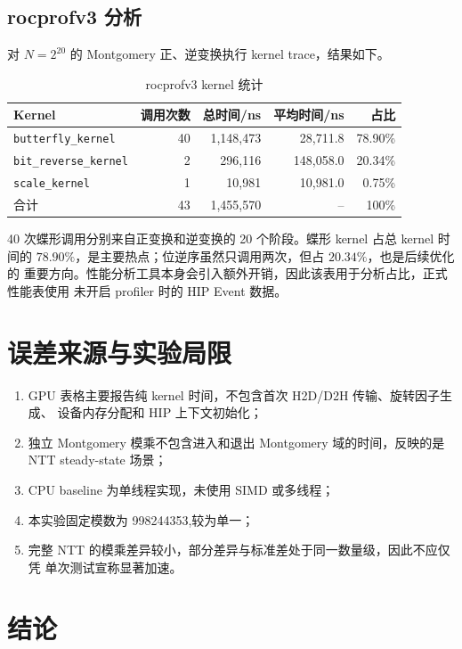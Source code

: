 ﻿\documentclass[a4paper]{article}
\begin{document}
\subsection{rocprofv3 分析}

对 $N=2^{20}$ 的 Montgomery 正、逆变换执行 kernel trace，结果如下。

\begin{table}[H]
  \centering
  \caption{rocprofv3 kernel 统计}
  \begin{tabular}{lrrrr}
    \toprule
    Kernel & 调用次数 & 总时间/ns & 平均时间/ns & 占比 \\
    \midrule
    \texttt{butterfly\_kernel} & 40 & 1,148,473 & 28,711.8 & 78.90\% \\
    \texttt{bit\_reverse\_kernel} & 2 & 296,116 & 148,058.0 & 20.34\% \\
    \texttt{scale\_kernel} & 1 & 10,981 & 10,981.0 & 0.75\% \\
    \midrule
    合计 & 43 & 1,455,570 & -- & 100\% \\
    \bottomrule
  \end{tabular}
\end{table}

40 次蝶形调用分别来自正变换和逆变换的 20 个阶段。蝶形 kernel 占总 kernel 时间的
$78.90\%$，是主要热点；位逆序虽然只调用两次，但占 $20.34\%$，也是后续优化的
重要方向。性能分析工具本身会引入额外开销，因此该表用于分析占比，正式性能表使用
未开启 profiler 时的 HIP Event 数据。

\section{误差来源与实验局限}

\begin{enumerate}
  \item GPU 表格主要报告纯 kernel 时间，不包含首次 H2D/D2H 传输、旋转因子生成、
        设备内存分配和 HIP 上下文初始化；
  \item 独立 Montgomery 模乘不包含进入和退出 Montgomery 域的时间，反映的是 NTT
        steady-state 场景；
  \item CPU baseline 为单线程实现，未使用 SIMD 或多线程；
  \item 本实验固定模数为 998244353,较为单一；
  \item 完整 NTT 的模乘差异较小，部分差异与标准差处于同一数量级，因此不应仅凭
        单次测试宣称显著加速。
\end{enumerate}

\section{结论}
\end{document}
